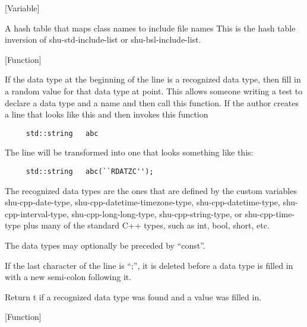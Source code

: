 \vspace{1em}
\noindent
{}
\usebox{\funcname}
 \hfill [Variable]

\begin{doc-string}
A hash table that maps class names to include file names  This is the hash table
inversion of shu-std-include-list or shu-bsl-include-list.
\end{doc-string}

\vspace{1em}
\noindent
{}
\usebox{\funcname}
 \hfill [Function]

\begin{doc-string}
If the data type at the beginning of the line is a recognized data type, then
fill in a random value for that data type at point.  This allows someone writing
a test to declare a data type and a name and then call this function.  If the
author creates a line that looks like this and then invokes this function

\small{\begin{verbatim}
     std::string   abc
\end{verbatim}}

The line will be transformed into one that looks something like this:

\small{\begin{verbatim}
     std::string   abc(``RDATZC'');
\end{verbatim}}

The recognized data types are the ones that are defined by the custom variables
shu-cpp-date-type, shu-cpp-datetime-timezone-type, shu-cpp-datetime-type,
shu-cpp-interval-type, shu-cpp-long-long-type, shu-cpp-string-type, or
shu-cpp-time-type plus many of the standard C++ types, such as int, bool, short,
etc.

The data types may optionally be preceded by ``const''.

If the last character of the line is ``;'', it is deleted before a data type is
filled in with a new semi-colon following it.

Return t if a recognized data type was found and a value was filled in.
\end{doc-string}

\vspace{1em}
\noindent
{}
\usebox{\funcname}
 \hfill [Function]

